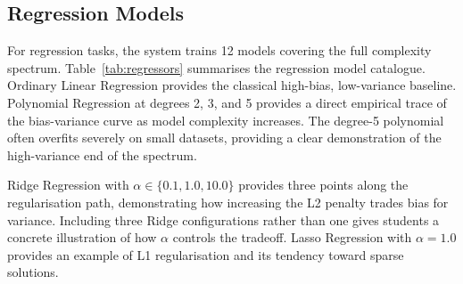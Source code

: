 \documentclass[conference]{IEEEtran}
\begin{document}
\subsection{Regression Models}

For regression tasks, the system trains 12 models covering the full complexity spectrum. Table~\ref{tab:regressors} summarises the regression model catalogue. Ordinary Linear Regression provides the classical high-bias, low-variance baseline. Polynomial Regression at degrees 2, 3, and 5 provides a direct empirical trace of the bias-variance curve as model complexity increases. The degree-5 polynomial often overfits severely on small datasets, providing a clear demonstration of the high-variance end of the spectrum.

Ridge Regression with $\alpha \in \{0.1, 1.0, 10.0\}$ provides three points along the regularisation path, demonstrating how increasing the L2 penalty trades bias for variance. Including three Ridge configurations rather than one gives students a concrete illustration of how $\alpha$ controls the tradeoff. Lasso Regression with $\alpha=1.0$ provides an example of L1 regularisation and its tendency toward sparse solutions.
\end{document}
